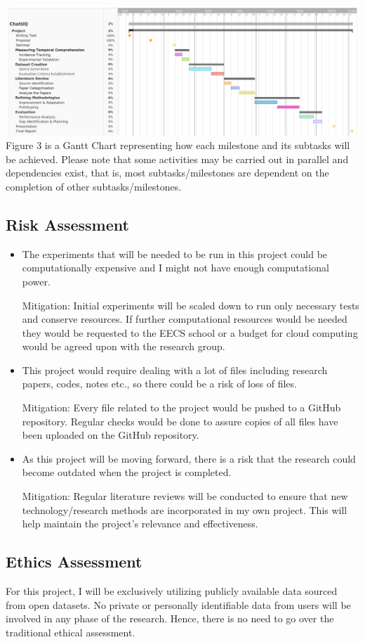\includegraphics[width=\textwidth]{Gantt Chart.png} \\

Figure 3 is a Gantt Chart representing how each milestone and its subtasks will be achieved. Please note that some activities may be carried out in parallel and dependencies exist, that is, most subtasks/milestones are dependent on the completion of other subtasks/milestones. 

\subsection{Risk Assessment}

\begin{itemize}

\item The experiments that will be needed to be run in this project could be computationally expensive and I might not have enough computational power.

Mitigation: Initial experiments will be scaled down to run only necessary tests and conserve resources. If further computational resources would be needed they would be requested to the EECS school or a budget for cloud computing would be agreed upon with the research group.

\item This project would require dealing with a lot of files including research papers, codes, notes etc., so there could be a risk of loss of files.

Mitigation: Every file related to the project would be pushed to a GitHub repository. Regular checks would be done to assure copies of all files have been uploaded on the GitHub repository.

\item As this project will be moving forward, there is a risk that the research could become outdated when the project is completed.

Mitigation: Regular literature reviews will be conducted to ensure that new technology/research methods are incorporated in my own project. This will help maintain the project's relevance and effectiveness.

\end{itemize}

\subsection{Ethics Assessment}

For this project, I will be exclusively utilizing publicly available data sourced from open datasets. No private or personally identifiable data from users will be involved in any phase of the research. Hence, there is no need to go over the traditional ethical assessment.